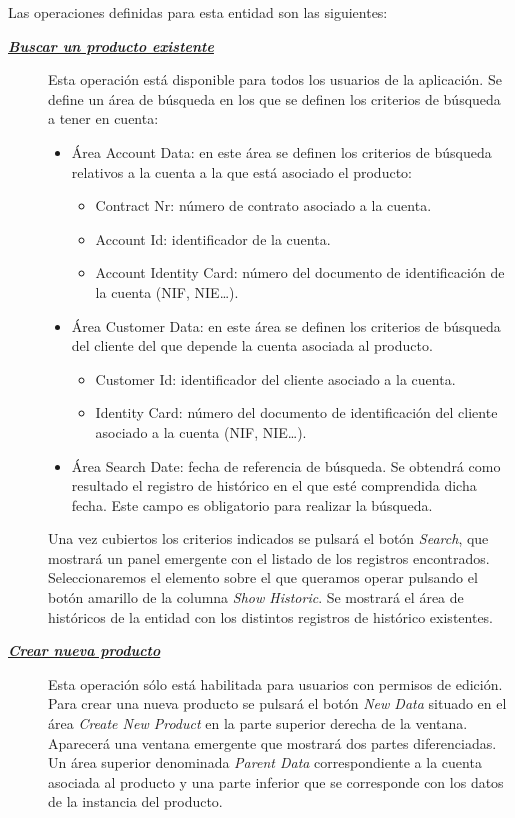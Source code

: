 Las operaciones definidas para esta entidad son las siguientes:

\begin{description}
\item[\underline{\textsl{\textbf{Buscar un producto existente}}}] Esta operación está disponible para todos los usuarios de la aplicación.
Se define un área de búsqueda en los que se definen los criterios de búsqueda a tener en cuenta:
\begin{itemize}
	\item Área Account Data: en este área se definen los criterios de búsqueda relativos a la cuenta a la que está asociado el producto:
	\begin{itemize}
		\item Contract Nr: número de contrato asociado a la cuenta.
		\item Account Id: identificador de la cuenta.
		\item Account Identity Card: número del documento de identificación de la cuenta (NIF, NIE\dots).
	\end{itemize}
	\item Área Customer Data: en este área se definen los criterios de búsqueda del cliente del que depende la cuenta asociada al producto.
	\begin{itemize}
		\item Customer Id: identificador del cliente asociado a la cuenta.
		\item Identity Card: número del documento de identificación del cliente asociado a la cuenta (NIF, NIE\dots).
	\end{itemize}
	\item Área Search Date: fecha de referencia de búsqueda. Se obtendrá como resultado el registro de histórico en el que esté comprendida dicha fecha. Este campo es obligatorio para realizar la búsqueda.
\end{itemize}

Una vez cubiertos los criterios indicados se pulsará el botón \emph{Search}, que mostrará un panel emergente con el listado de los registros encontrados. Seleccionaremos el elemento sobre el que queramos operar pulsando el botón amarillo de la columna \emph{Show Historic}. Se mostrará el área de históricos de la entidad con los distintos registros de histórico existentes.


\item[\underline{\textsl{\textbf{Crear nueva producto}}}] Esta operación sólo está habilitada para usuarios con permisos de edición.
Para crear una nueva producto se pulsará el botón \textit{New Data} situado en el área \emph{Create New Product} en la parte superior derecha de la ventana. Aparecerá una ventana emergente que mostrará dos partes diferenciadas. Un área superior denominada \emph{Parent Data} correspondiente a la cuenta asociada al producto y una parte inferior que se corresponde con los datos de la instancia del producto.


\end{description}
